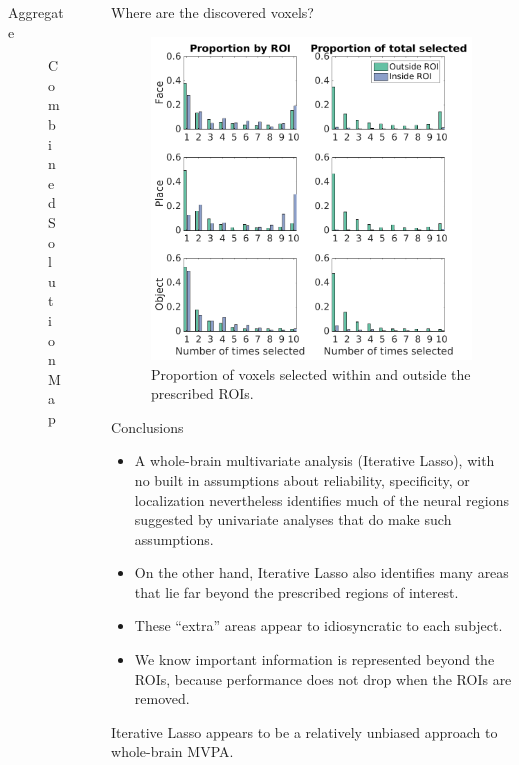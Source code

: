 \documentclass[final]{beamer}
\newlength{\sepwid}
\newlength{\introcolwid}
\begin{document}
\begin{frame}[t]
\begin{columns}[t]
\begin{column}{\introcolwid}
\begin{block}{Aggregate}
\begin{figure}
				\caption{Combined Solution Map}
			\end{figure}
          \end{block}
	\end{column}
	\begin{column}{\sepwid}\end{column}			%
	\begin{column}{\introcolwid}
      \begin{block}{Where are the discovered voxels?}
		\begin{figure}
			\includegraphics[width=\textwidth]{figures/Summary_ProportionSelected.png}
			\caption{Proportion of voxels selected within and outside the prescribed ROIs.}
		\end{figure}
      \end{block}
      
      \begin{block}{Conclusions}
      	\begin{itemize}
      		\item A whole-brain multivariate analysis (Iterative Lasso), with no built in assumptions about reliability, specificity, or localization nevertheless identifies much of the neural regions suggested by univariate analyses that do make such assumptions.
      		\item On the other hand, Iterative Lasso also identifies many areas that lie far beyond the prescribed regions of interest.
      		\item These ``extra'' areas appear to idiosyncratic to each subject.  
      		\item We know important information is represented beyond the ROIs, because performance does not drop when the ROIs are removed.
      	\end{itemize}
      	Iterative Lasso appears to be a relatively unbiased approach to whole-brain MVPA.


\end{block}
\end{column}
\end{columns}
\end{frame}
\end{document}
